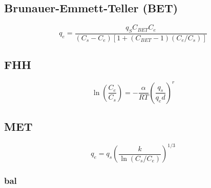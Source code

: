 \documentclass[3p]{elsarticle}
\begin{document}
\subsection{Brunauer-Emmett-Teller (BET)}
\begin{equation}
q_e =
\frac{q_SC_{BET}C_e}{\left(C_s-C_e\right)\left[1+\left(C_{BET}-1\right)\left(C_e/C_s\right)\right]}
\end{equation}

\subsection{FHH}
\begin{equation}
\ln\left(\frac{C_e}{C_s}\right) =
-\frac{\alpha}{RT}\left(\frac{q_s}{q_ed}\right)^r
\end{equation}

\subsection{MET}
\begin{equation}
q_e = q_s\left(\frac{k}{\ln\left(C_s/C_e\right)}\right)^{1/3}
\end{equation}




\subsubsection{bal}


\end{document}
